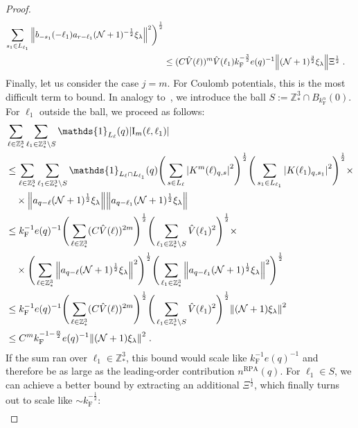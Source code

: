\documentclass[12pt,a4paper]{article}
\numberwithin{equation}{section}
\newcommand{\1}{\mathbb{I}}
\newcommand{\F}{\mathrm{F}}
\newcommand{\I}{\mathrm{I}}
\newcommand{\RPA}{\mathrm{RPA}}
\newcommand{\Z}{\mathbb{Z}}
\newcommand{\NN}{\mathcal{N}}
\newcommand{\half}{\frac{1}{2}}
\theoremstyle{plain}
\theoremstyle{definition}
\theoremstyle{remark}
\theoremstyle{plain}
\theoremstyle{definition}
\theoremstyle{remark}
\begin{document}
\begin{proof}
\begin{align}
		\sum_{s_1 \in L_{\ell_1}}\norm{ b_{-s_1}(-\ell_1) a_{r-\ell_1} (\NN+1)^{-\half}\xi_\lambda }^2\bigg)^\half
	\nonumber\\
	&\leq (C \hat{V}(\ell))^m
		\hat{V}(\ell_1)
		k_{\F}^{-\frac 32} e(q)^{-1}
		\norm{ (\NN+1)^{\frac 32}\xi_\lambda } \Xi^{\half} \;. \label{eq:estEQ2112}
\end{align}
Finally, let us consider the case $ j = m $. For Coulomb potentials, this is the most difficult term to bound. In analogy to~\cite{CHN24}, we introduce the ball $ S := \Z^3_* \cap B_{k_{\F}^{\alpha}}(0) $. For $ \ell_1 $ outside the ball, we proceed as follows:
\begin{align}
	&\sum_{\ell \in \Z^3_*} \sum_{\ell_1 \in \Z^3_* \setminus S} \mathds{1}_{L_\ell}(q) |\I_m(\ell, \ell_1)| \nonumber\\
	&\leq \sum_{\ell \in \Z^3_*} \sum_{\ell_1 \in \Z^3_* \setminus S} \mathds{1}_{L_\ell \cap L_{\ell_1}}(q) \Bigg(\sum\limits_{s \in L_{\ell}} \abs{K^m(\ell)_{q,s}}^2\Bigg)^\half
		\Bigg(\sum\limits_{s_1 \in L_{\ell_1}} \abs{K(\ell_1)_{q,s_1}}^2\Bigg)^\half \times \nonumber \\
	& \quad \times \norm{ a_{q-\ell} (\NN+1)^{\half} \xi_\lambda}
		\norm{ a_{q-\ell_1} (\NN+1)^{\half} \xi_\lambda }\nonumber\\
	&\leq k_{\F}^{-1} e(q)^{-1}
		\Bigg( \sum_{\ell \in \Z^3_*} (C \hat{V}(\ell))^{2m} \Bigg)^{\half}
		\Bigg( \sum_{\ell_1 \in \Z^3_* \setminus S} \hat{V}(\ell_1)^2 \Bigg)^{\half} \times \nonumber \\
	& \quad \times 
		\Bigg( \sum_{\ell \in \Z^3_*} \norm{ a_{q-\ell} (\NN+1)^{\half} \xi_\lambda}^2 \Bigg)^{\half}
		\Bigg( \sum_{\ell_1 \in \Z^3_*} \norm{ a_{q-\ell_1} (\NN+1)^{\half} \xi_\lambda }^2 \Bigg)^{\half} \nonumber\\
	&\leq k_{\F}^{-1} e(q)^{-1}
		\Bigg( \sum_{\ell \in \Z^3_*} (C \hat{V}(\ell))^{2m} \Bigg)^{\half}
		\Bigg( \sum_{\ell_1 \in \Z^3_* \setminus S} \hat{V}(\ell_1)^2 \Bigg)^{\half} \norm{(\NN+1) \xi_\lambda}^2 \nonumber\\
	&\leq C^m k_{\F}^{-1-\frac{\alpha}{2}} e(q)^{-1}
		\norm{(\NN+1) \xi_\lambda}^2 \;. \label{eq:estEQ2113_Coulomb_1}
\end{align}
If the sum ran over $ \ell_1 \in \Z^3_* $, this bound would scale like $ k_{\F}^{-1} e(q)^{-1} $ and therefore be as large as the leading-order contribution $ n^{\RPA}(q) $. For $ \ell_1 \in S $, we can achieve a better bound by extracting an additional $ \Xi^{\half} $, which finally turns out to scale like $ \sim k_{\F}^{-\half} $:
\begin{align}

\end{align}
\end{proof}
\end{document}
